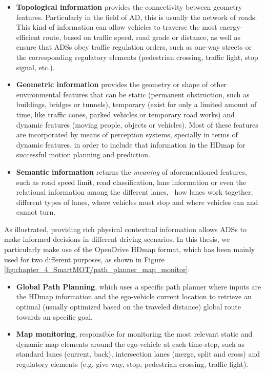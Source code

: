 \begin{itemize}
	
	\item \textbf{Topological information} provides the connectivity between geometry features. Particularly in the field of \ac{AD}, this is usually the network of roads. This kind of information can allow vehicles to traverse the most energy-efficient route, based on traffic speed, road grade or distance, as well as ensure that \acp{ADS} obey traffic regulation orders, such as one-way streets or the corresponding regulatory elements (pedestrian crossing, traffic light, stop signal, etc.).
	
	\item \textbf{Geometric information} provides the geometry or shape of other environmental features that can be static (permanent obstruction, such as buildings, bridges or tunnels), temporary (exist for only a limited amount of time, like traffic cones, parked vehicles or temporary road works) and dynamic features (moving people, objects or vehicles). Most of these features are incorporated by means of perception systems, specially in terms of dynamic features, in order to include that information in the \ac{HDmap} for successful motion planning and prediction.
	
	\item \textbf{Semantic information} returns the \textit{meaning} of aforementioned features, such as road speed limit, road classification, lane information or even the relational information among the different lanes, \ie \ how lanes work together, different types of lanes, where vehicles must stop and where vehicles can and cannot turn.
\end{itemize}

As illustrated, providing rich physical contextual information allows \acp{ADS} to make informed decisions in different driving scenarios. In this thesis, we particularly make use of the OpenDrive \cite{dupuis2010opendrive} \ac{HDmap} format, which has been mainly used for two different purposes, as shown in Figure \ref{fig:chapter_4_SmartMOT/path_planner_map_monitor}:

\begin{itemize}
	
	\item \textbf{Global Path Planning}, which uses a specific path planner where inputs are the \ac{HDmap} information and the ego-vehicle current location to retrieve an optimal (usually optimized based on the traveled distance) global route towards an specific goal.
	
	\item \textbf{Map monitoring}, responsible for monitoring the most relevant static and dynamic map elements around the ego-vehicle at each time-step, such as standard lanes (current, back), intersection lanes (merge, split and cross) and regulatory elements (e.g. give way, stop, pedestrian crossing, traffic light).
	
\end{itemize}

